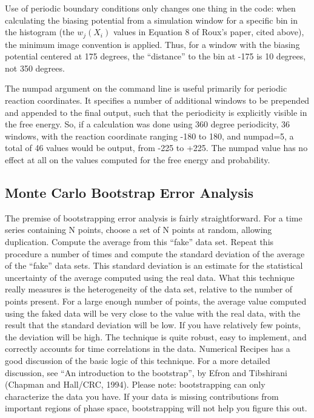 \documentclass[12pt]{article}
\begin{document}
Use of periodic boundary conditions only changes one thing in the
code: when calculating the biasing potential from a simulation window for a
specific bin in the histogram (the $w_j(X_i)$ values in Equation 8 of Roux's
paper, cited above), the minimum image convention is applied.  Thus, for a
window with the biasing potential centered at 175 degrees, the ``distance''
to the bin at -175 is 10 degrees, not 350 degrees.

The numpad argument on the command line is useful primarily for periodic
reaction coordinates.  It specifies a number of additional windows to be
prepended and appended to the final output, such that the periodicity is
explicitly visible in the free energy.  So, if a calculation was done using
360 degree periodicity, 36 windows, with the reaction coordinate ranging
-180 to 180, and numpad=5, a total of 46 values would be output, from -225
to +225.  The numpad value has no effect at all on the values computed for
the free energy and probability.

\subsection{Monte Carlo Bootstrap Error Analysis}
\label{ss:bootstrap}

The premise of bootstrapping error analysis is fairly straightforward.  For
a time series containing N points, choose a set of N points at random,
allowing duplication.  Compute the average from this ``fake'' data set.
Repeat this procedure a number of times and compute the standard deviation
of the average of the ``fake'' data sets.  This standard deviation is an
estimate for the statistical uncertainty of the average computed using the
real data.  What this technique really measures is the heterogeneity of the
data set, relative to the number of points present.  For a large enough
number of points, the average value computed using the faked data will be
very close to the value with the real data, with the result that the
standard deviation will be low.  If you have relatively few points, the
deviation will be high.  The technique is quite robust, easy to implement,
and correctly accounts for time correlations in the data.  Numerical
Recipes has a good discussion of the basic logic of this technique.  For a
more detailed discussion, see ``An introduction to the bootstrap'', by Efron
and Tibshirani (Chapman and Hall/CRC, 1994).  Please note: bootstrapping can
only characterize the data you have.  If your data is missing contributions
from important regions of phase space, bootstrapping will not help you figure
this out.
\end{document}
